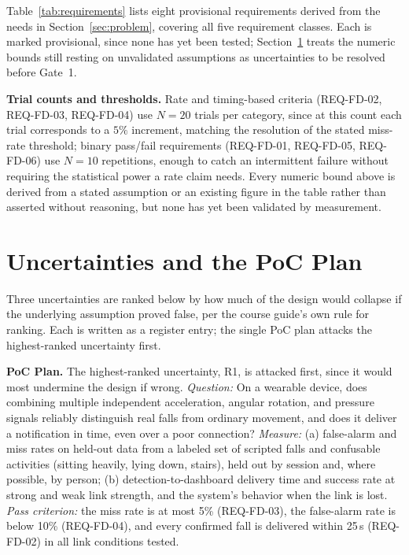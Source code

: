 \documentclass[conference,onecolumn]{IEEEtran}
\begin{document}
Table~\ref{tab:requirements} lists eight provisional requirements derived from the needs in Section~\ref{sec:problem}, covering all five requirement classes. Each is marked provisional, since none has yet been tested; Section~\ref{sec:uncertainties} treats the numeric bounds still resting on unvalidated assumptions as uncertainties to be resolved before Gate~1.



\textbf{Trial counts and thresholds.} Rate and timing-based criteria (REQ-FD-02, REQ-FD-03, REQ-FD-04) use $N=20$ trials per category, since at this count each trial corresponds to a $5\%$ increment, matching the resolution of the stated miss-rate threshold; binary pass/fail requirements (REQ-FD-01, REQ-FD-05, REQ-FD-06) use $N=10$ repetitions, enough to catch an intermittent failure without requiring the statistical power a rate claim needs. Every numeric bound above is derived from a stated assumption or an existing figure in the table rather than asserted without reasoning, but none has yet been validated by measurement.

\section{Uncertainties and the PoC Plan}
\label{sec:uncertainties}

Three uncertainties are ranked below by how much of the design would collapse if the underlying assumption proved false, per the course guide's own rule for ranking. Each is written as a register entry; the single PoC plan attacks the highest-ranked uncertainty first.

\textbf{PoC Plan.} The highest-ranked uncertainty, R1, is attacked first, since it would most undermine the design if wrong. \emph{Question:} On a wearable device, does combining multiple independent acceleration, angular rotation, and pressure signals reliably distinguish real falls from ordinary movement, and does it deliver a notification in time, even over a poor connection? \emph{Measure:} (a) false-alarm and miss rates on held-out data from a labeled set of scripted falls and confusable activities (sitting heavily, lying down, stairs), held out by session and, where possible, by person; (b) detection-to-dashboard delivery time and success rate at strong and weak link strength, and the system's behavior when the link is lost. \emph{Pass criterion:} the miss rate is at most 5\% (REQ-FD-03), the false-alarm rate is below 10\% (REQ-FD-04), and every confirmed fall is delivered within 25\,s (REQ-FD-02) in all link conditions tested.
\end{document}

